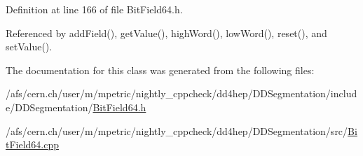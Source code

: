 Definition at line 166 of file BitField64.h.

Referenced by addField(), getValue(), highWord(), lowWord(), reset(), and setValue().

The documentation for this class was generated from the following files:\begin{DoxyCompactItemize}
\item 
/afs/cern.ch/user/m/mpetric/nightly\_\-cppcheck/dd4hep/DDSegmentation/include/DDSegmentation/\hyperlink{_d_d_segmentation_2include_2_d_d_segmentation_2_bit_field64_8h}{BitField64.h}\item 
/afs/cern.ch/user/m/mpetric/nightly\_\-cppcheck/dd4hep/DDSegmentation/src/\hyperlink{_bit_field64_8cpp}{BitField64.cpp}\end{DoxyCompactItemize}
